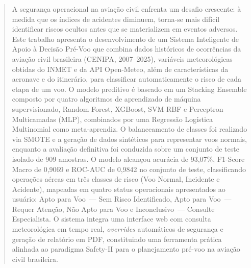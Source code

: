 \documentclass[english,brazilian]{UNISINOSartigo}
\begin{document}
\capa
\folhaderosto




\begin{abstract}
A segurança operacional na aviação civil enfrenta um desafio crescente: à medida
que os índices de acidentes diminuem, torna-se mais difícil identificar riscos ocultos
antes que se materializem em eventos adversos. Este trabalho apresenta o
desenvolvimento de um Sistema Inteligente de Apoio à Decisão Pré-Voo que combina
dados históricos de ocorrências da aviação civil brasileira (CENIPA, 2007--2025),
variáveis meteorológicas obtidas do INMET e da API Open-Meteo, além de
características da aeronave e do itinerário, para classificar automaticamente o risco
de cada etapa de um voo. O modelo preditivo é baseado em um Stacking Ensemble
composto por quatro algoritmos de aprendizado de máquina supervisionado,
Random Forest, XGBoost, SVM-RBF e Perceptron Multicamadas (MLP),
combinados por uma Regressão Logística Multinomial como meta-aprendiz. O
balanceamento de classes foi realizado via SMOTE e a geração de dados sintéticos
para representar voos normais, enquanto a avaliação definitiva foi conduzida
sobre um conjunto de teste isolado de 909 amostras. O modelo alcançou
acurácia de 93,07\%, F1-Score Macro de 0,9069 e ROC-AUC de 0,9842 no conjunto
de teste, classificando operações aéreas em três classes de risco (Voo Normal,
Incidente e Acidente), mapeadas em quatro status operacionais apresentados ao usuário: Apto para
Voo~--- Sem Risco Identificado, Apto para Voo~--- Requer Atenção,
Não Apto para Voo e Inconclusivo~--- Consulte Especialista. O sistema integra uma interface web com
consulta meteorológica em tempo real, \textit{overrides} automáticos de segurança
e geração de relatório em PDF, constituindo uma ferramenta prática alinhada ao
paradigma Safety-II para o planejamento pré-voo na aviação civil brasileira.

\end{abstract}
\end{document}
